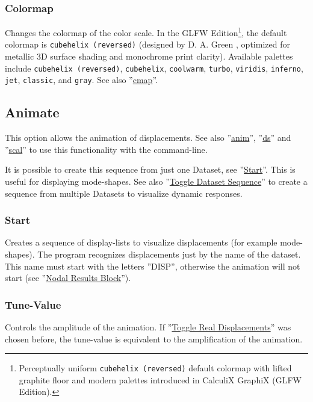 \documentclass{article}
\providecommand{\htmlref}[2]{\hyperref[#2]{#1}}
\begin{document}
\subsubsection{\label{Colormap}Colormap}
Changes the colormap of the color scale. In the GLFW Edition\footnote{Perceptually uniform \texttt{cubehelix (reversed)} default colormap with lifted graphite floor and modern palettes introduced in CalculiX GraphiX (GLFW Edition).}, the default colormap is \texttt{cubehelix (reversed)} (designed by D. A. Green \cite{cubehelix}, optimized for metallic 3D surface shading and monochrome print clarity). Available palettes include \texttt{cubehelix (reversed)}, \texttt{cubehelix}, \texttt{coolwarm}, \texttt{turbo}, \texttt{viridis}, \texttt{inferno}, \texttt{jet}, \texttt{classic}, and \texttt{gray}. See also ''\htmlref{cmap}{cmap}''.

\subsection{\label{animation}Animate}
This option allows the animation of displacements. See also ''\htmlref{anim}{anim}'', ''\htmlref{ds}{ds}'' and ''\htmlref{scal}{scal}'' to use this functionality with the command-line.

It is possible to create this sequence from just one Dataset, see ''\htmlref{Start}{Start}''. This is useful for displaying mode-shapes. See also ''\htmlref{Toggle Dataset Sequence}{Toggle Dataset Sequence}'' to create a sequence from multiple Datasets to visualize dynamic responses.
   
\subsubsection{\label{Start}Start}
Creates a sequence of display-lists to visualize displacements (for example mode-shapes). The program recognizes displacements just by the name of the dataset. This name must start with the letters ''DISP'', otherwise the animation will not start (see ''\htmlref{Nodal Results Block}{Nodal Results Block}'').

\subsubsection{\label{Tune-Value}Tune-Value}
Controls the amplitude of the animation. If ''\htmlref{Toggle Real Displacements}{Toggle Real Displacements}'' was chosen before, the tune-value is equivalent to the amplification of the animation. 
\end{document}
